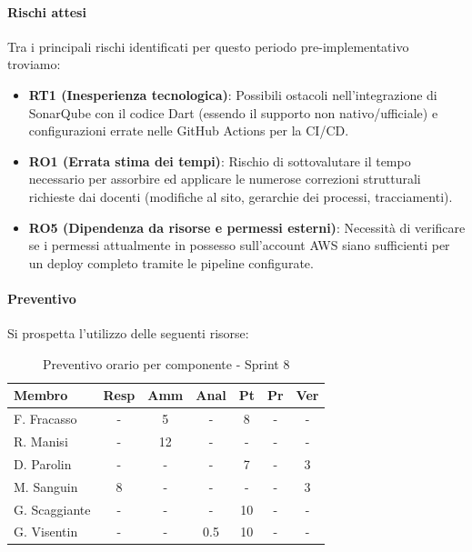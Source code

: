 \documentclass[a4paper,12pt]{article}
\begin{document}
\paragraph{Rischi attesi}
Tra i principali rischi identificati per questo periodo pre-implementativo troviamo:
\begin{itemize}
    \item \textbf{RT1 (Inesperienza tecnologica)}: Possibili ostacoli nell'integrazione di SonarQube con il codice Dart (essendo il supporto non nativo/ufficiale) e configurazioni errate nelle GitHub Actions per la CI/CD.
    \item \textbf{RO1 (Errata stima dei tempi)}: Rischio di sottovalutare il tempo necessario per assorbire ed applicare le numerose correzioni strutturali richieste dai docenti (modifiche al sito, gerarchie dei processi, tracciamenti).
    \item \textbf{RO5 (Dipendenza da risorse e permessi esterni)}: Necessità di verificare se i permessi attualmente in possesso sull'account AWS siano sufficienti per un deploy completo tramite le pipeline configurate.
\end{itemize}

\paragraph{Preventivo}
Si prospetta l'utilizzo delle seguenti risorse:

\begin{table}[H]
    \centering
    \renewcommand{\arraystretch}{1.3}
    \small 
    \begin{tabularx}{\textwidth}{|l|C|C|C|C|C|C|}
        \hline
        \textbf{Membro} & \textbf{Resp} & \textbf{Amm} & \textbf{Anal} & \textbf{Pt} & \textbf{Pr} & \textbf{Ver} \\
        \hline
        F. Fracasso & - & 5 & - & 8 & - & - \\
        \hline
        R. Manisi & - & 12 & - & - & - & - \\
        \hline
        D. Parolin & - & - & - & 7 & - & 3 \\
        \hline
        M. Sanguin & 8 & - & - & - & - & 3 \\
        \hline
        G. Scaggiante & - & - & - & 10 & - & - \\
        \hline
        G. Visentin & - & - & 0.5 & 10 & - & - \\
        \hline
    \end{tabularx}
    \caption{Preventivo orario per componente - Sprint 8}
    \label{tab:preventivo_sprint8}
\end{table}
\end{document}
